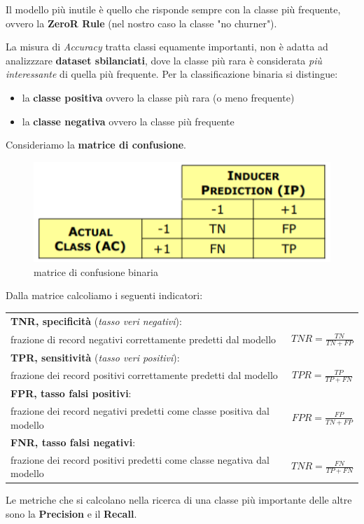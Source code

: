 \begin{defn}
	Il modello più inutile è quello che risponde sempre con la classe più frequente, ovvero la \textbf{ZeroR Rule} (nel nostro caso la classe "no churner").	
\end{defn}
La misura di \textit{Accuracy} tratta classi equamente importanti, non è adatta ad analizzzare \textbf{dataset sbilanciati},  dove la classe più rara è considerata \textit{più interessante} di quella più frequente. Per la classificazione binaria si distingue:
\begin{itemize}
	\item la \textbf{classe positiva} ovvero la classe più rara (o meno frequente)
	\item la \textbf{classe negativa} ovvero la classe più frequente
\end{itemize}
Consideriamo la \textbf{matrice di confusione}.
\begin{figure}[H]
	\centering
	\includegraphics[height=0.25 \linewidth]{classification/pict/matrconf.png}
	\caption{matrice di confusione binaria}
\end{figure}
Dalla matrice calcoliamo i seguenti indicatori:
\begin{table}[H]
	\centering
	\begin{tabular}{p{10cm}c}
		\textbf{TNR, specificit\`a} (\textit{tasso veri negativi}): \\ \quad frazione di record negativi correttamente predetti dal modello & $TNR = \frac{TN}{TN + FP}$\\
		\textbf{TPR, sensitivit\`a} (\textit{tasso veri positivi}):\\ \quad frazione dei record positivi correttamente predetti dal modello & $TPR = \frac{TP}{TP + FN}$\\
		\textbf{FPR, tasso falsi positivi}:\\ \quad frazione dei record negativi predetti come classe positiva dal modello & $FPR = \frac{FP}{TN + FP}$\\
		\textbf{FNR, tasso falsi negativi}:\\ \quad frazione dei record positivi predetti come classe negativa dal modello & $TNR = \frac{FN}{TP + FN}$\\
	\end{tabular}
\end{table}
Le metriche che si calcolano nella ricerca di una classe più importante delle altre sono la \textbf{Precision} e il \textbf{Recall}.

